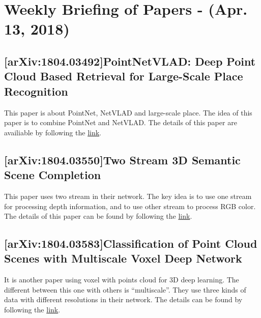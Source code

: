 \section{Weekly Briefing of Papers - (Apr. 13, 2018)}

\subsection{[arXiv:1804.03492]PointNetVLAD: Deep Point Cloud Based Retrieval for
  Large-Scale Place Recognition}

This paper is about PointNet, NetVLAD and large-scale place. The idea of this
paper is to combine PointNet and NetVLAD.
The details of this paper are availiable by following the
\href{https://arxiv.org/abs/1804.03492}{link}.

\subsection{[arXiv:1804.03550]Two Stream 3D Semantic Scene Completion}

This paper uses two stream in their network. The key idea is to use one stream
for processing depth information, and to use other stream to process RGB color.
The details of this paper can be found by following the
\href{https://arxiv.org/abs/1804.03550}{link}.

\subsection{[arXiv:1804.03583]Classification of Point Cloud Scenes with
  Multiscale Voxel Deep Network}

It is another paper using voxel with points cloud for 3D deep learning.
The different between this one with others is ``multiscale''.
They use three kinds of data with different resolutions in their network.
The details can be found by following the \href{https://arxiv.org/abs/1804.03583}{link}.
